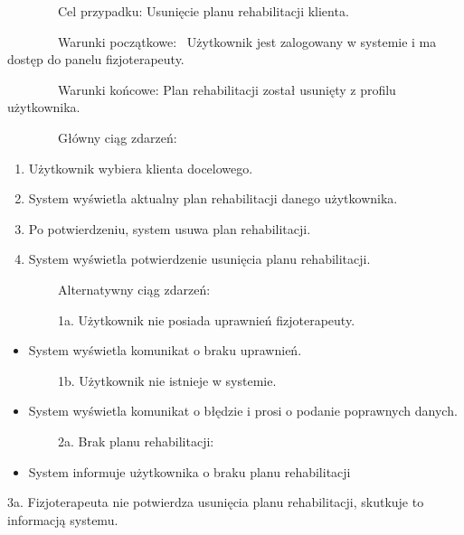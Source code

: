 {~~~~~~~~Cel przypadku: Usunięcie planu rehabilitacji klienta.}

{~~~~~~~~Warunki początkowe: ~Użytkownik jest zalogowany w systemie i ma
dostęp do panelu fizjoterapeuty.}

{~~~~~~~~Warunki końcowe: Plan rehabilitacji został usunięty z profilu
użytkownika.}

{~~~~~~~~Główny ciąg zdarzeń:}

\begin{enumerate}
\tightlist
\item
  {Użytkownik wybiera klienta docelowego.}
\item
  {System wyświetla aktualny plan rehabilitacji danego użytkownika.}
\item
  {Po potwierdzeniu, system usuwa plan rehabilitacji.}
\item
  {System wyświetla potwierdzenie usunięcia planu rehabilitacji.}
\end{enumerate}

{~~~~~~~~Alternatywny ciąg zdarzeń:}

{~~~~~~~~1a. Użytkownik nie posiada uprawnień fizjoterapeuty.}

\begin{itemize}
\tightlist
\item
  {System wyświetla komunikat o braku uprawnień.}
\end{itemize}

{~~~~~~~~1b. Użytkownik nie istnieje w systemie.}

\begin{itemize}
\tightlist
\item
  {System wyświetla komunikat o błędzie i prosi o podanie poprawnych
  danych.}
\end{itemize}

{~~~~~~~~2a. Brak planu rehabilitacji:}

\begin{itemize}
\tightlist
\item
  {System informuje użytkownika o braku planu rehabilitacji}
\end{itemize}

{3a. Fizjoterapeuta nie potwierdza usunięcia planu
rehabilitacji, skutkuje to informacją systemu.}